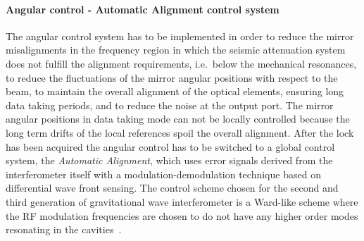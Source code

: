 
\FloatBarrier
\paragraph{Angular control - Automatic Alignment control system}%

The angular control system has to be implemented in order to reduce the mirror misalignments 
in the frequency region in which the seismic attenuation system does not fulfill the alignment
requirements, i.e.\ below the mechanical resonances, to reduce  the fluctuations of the mirror 
angular positions with respect to the beam,  to maintain the overall alignment of the optical elements, 
ensuring long data taking periods, and to reduce the noise at the output
port.
The mirror angular positions in data taking mode can not be locally controlled because the long term 
drifts of the local references spoil the overall alignment.  
After the lock has been acquired the angular control has to be switched to a global control system, the
 \textit{Automatic Alignment},  which uses error signals derived from the interferometer itself with a
 modulation-demodulation technique based on differential wave front sensing.
The control scheme chosen for the second and third generation of gravitational wave interferometer
 is a Ward-like scheme where the RF modulation frequencies are chosen to do not have any 
  higher order modes resonating in the cavities~\cite{ward}.

